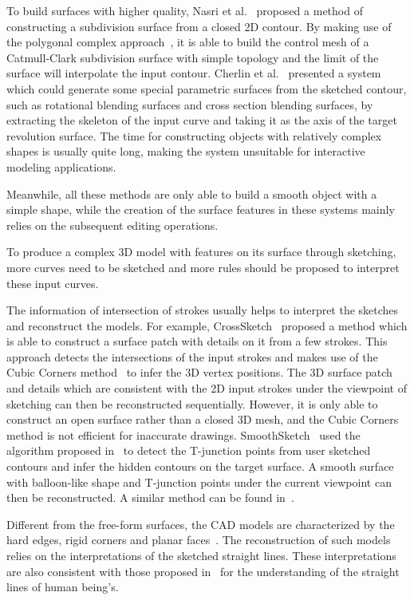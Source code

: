 To build surfaces with higher quality,  Nasri et al.~\cite{NKS09}
proposed a method of constructing a subdivision surface from a
closed 2D contour. By making use of the polygonal
complex approach~\cite{NA00}, it is able to build the control mesh of a
Catmull-Clark subdivision surface with simple topology and the limit
of the surface will interpolate the input contour. Cherlin et
al.~\cite{CSSJ05} presented a system which could generate some
special parametric surfaces from the sketched contour, such as
rotational blending surfaces and cross section blending surfaces, by
extracting the skeleton of the input curve and taking it as the axis
of the target revolution surface. The time for constructing objects
with relatively complex shapes is usually quite long, making the
system unsuitable for interactive modeling applications.

Meanwhile, all these methods are only  able to build a smooth object
with a simple shape, while the creation of the surface features in
these systems mainly relies on the subsequent editing operations.

To produce a complex 3D model with features  on its surface through
sketching, more curves need to be sketched and more rules should be
proposed to interpret these input curves.

The information of intersection of strokes  usually helps to
interpret the sketches and reconstruct the models. For example,
CrossSketch~\cite{ASN07} proposed a method which is able to
construct a surface patch with details on it from a few strokes.
This approach detects the intersections of the input strokes and
makes use of the Cubic Corners method~\cite{DP1968} to infer the 3D
vertex positions. The 3D surface patch and details which are
consistent with the 2D input strokes under the viewpoint of
sketching can then be reconstructed sequentially. However, it is
only able to construct an open surface rather than a closed 3D mesh,
and the Cubic Corners method is not efficient for inaccurate
drawings. SmoothSketch~\cite{KH06} used the algorithm proposed
in~\cite{WH96} to detect the T-junction points from user sketched
contours and infer the hidden contours on the target surface. A
smooth surface with balloon-like shape and T-junction points under
the current viewpoint can then be reconstructed. A similar method
can be found in~\cite{CS07}.

Different from the free-form surfaces, the  CAD models are
characterized by the hard edges, rigid corners and planar
faces~\cite{OSSJ09}. The reconstruction of such models relies on the
interpretations of the sketched straight lines. These
interpretations are also consistent with those proposed
in~\cite{HD00} for the understanding of the straight lines of human
being's.

